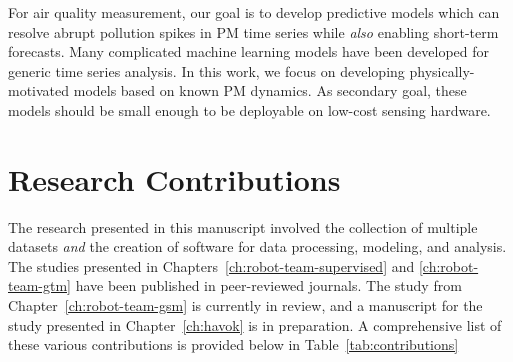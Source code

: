 For air quality measurement, our goal is to develop predictive models which can
resolve abrupt pollution spikes in PM time series while \textit{also} enabling
short-term forecasts. Many complicated machine learning models have been
developed for generic time series analysis. In this work, we focus on developing
physically-motivated models based on known PM dynamics. As secondary goal, these
models should be small enough to be deployable on low-cost sensing hardware.


\section{Research Contributions}

The research presented in this manuscript involved the collection of multiple
datasets \textit{and} the creation of software for data processing, modeling,
and analysis. The studies presented in Chapters~\ref{ch:robot-team-supervised}
and \ref{ch:robot-team-gtm} have been published in peer-reviewed journals. The
study from Chapter~\ref{ch:robot-team-gsm} is currently in review, and a
manuscript for the study presented in Chapter~\ref{ch:havok} is in preparation.
A comprehensive list of these various contributions is provided below in
Table~\ref{tab:contributions}



